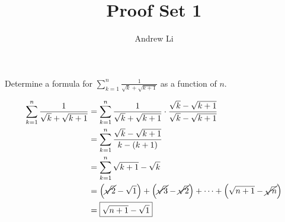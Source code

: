 \documentclass{homework}
\title{Proof Set 1}
\author{Andrew Li}
\begin{document}
  \maketitle

  \begin{problem}
    Determine a formula for $\displaystyle\sum_{k=1}^n \frac{1}{\sqrt{k}+\sqrt{k+1}}$ as a function of $n$.
    
    \solution
    \begin{align*}
      \sum_{k=1}^n \frac{1}{\sqrt{k}+\sqrt{k+1}} &= \sum_{k=1}^n \frac{1}{\sqrt{k}+\sqrt{k+1}} \cdot \frac{\sqrt{k}-\sqrt{k+1}}{\sqrt{k}-\sqrt{k+1}} \\
      &= \sum_{k=1}^n \frac{\sqrt{k}-\sqrt{k+1}}{k-(k+1)} \\
      &= \sum_{k=1}^n \sqrt{k+1}-\sqrt{k} \\
      &= \left(\cancel{\sqrt{2}}-\sqrt{1}\right) + \left(\cancel{\sqrt{3}}-\cancel{\sqrt{2}}\right) + \cdots + \left(\sqrt{n+1}-\cancel{\sqrt{n}}\right) \\
      &= \boxed{\sqrt{n+1}-\sqrt{1}}
    \end{align*}
  \end{problem}
\end{document}
